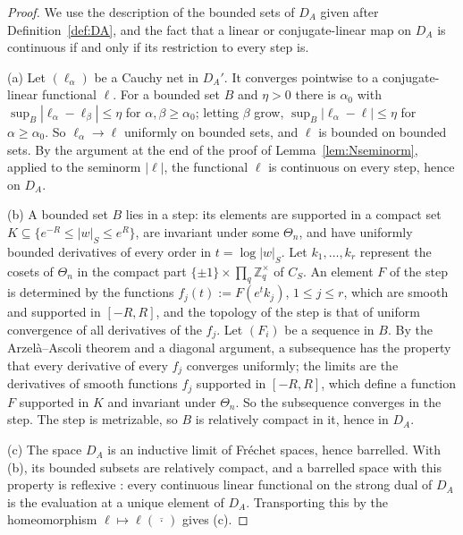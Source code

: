 \documentclass[11pt]{amsart}
\theoremstyle{definition}
\theoremstyle{remark}
\newcommand{\Z}{\mathbb Z}
\newcommand{\DA}{D_A}
\begin{document}
\begin{proof}
We use the description of the bounded sets of $\DA$ given after
Definition~\ref{def:DA}, and the fact that a linear or conjugate-linear map on
$\DA$ is continuous if and only if its restriction to every step is.

(a)  Let $(\ell_{\alpha})$ be a Cauchy net in $\DA'$.  It converges pointwise
to a conjugate-linear functional $\ell$.  For a bounded set $B$ and
$\eta>0$ there is $\alpha_0$ with
$\sup_B|\ell_{\alpha}-\ell_{\beta}|\le\eta$ for
$\alpha,\beta\ge\alpha_0$; letting $\beta$ grow,
$\sup_B|\ell_{\alpha}-\ell|\le\eta$ for $\alpha\ge\alpha_0$.  So
$\ell_{\alpha}\to\ell$ uniformly on bounded sets, and $\ell$ is bounded on
bounded sets.  By the argument at the end of the proof of
Lemma~\ref{lem:Nseminorm}, applied to the seminorm $|\ell|$, the functional
$\ell$ is continuous on every step, hence on $\DA$.

(b)  A bounded set $B$ lies in a step: its elements are supported in a compact
set $K\subseteq\{e^{-R}\le|w|_S\le e^{R}\}$, are invariant under some
$\Theta_n$, and have uniformly bounded derivatives of every order in
$t=\log|w|_S$.  Let $k_1,\dots,k_r$ represent the cosets of $\Theta_n$ in the
compact part $\{\pm1\}\times\prod_q\Z_q^{\times}$ of $C_S$.  An element $F$ of
the step is determined by the functions $f_j(t):=F(e^{t}k_j)$,
$1\le j\le r$, which are smooth and supported in $[-R,R]$, and the topology of
the step is that of uniform convergence of all derivatives of the $f_j$.  Let
$(F_i)$ be a sequence in $B$.  By the Arzel\`a--Ascoli theorem and a diagonal
argument, a subsequence has the property that every derivative of every $f_j$
converges uniformly; the limits are the derivatives of smooth functions $f_j$
supported in $[-R,R]$, which define a function $F$ supported in $K$ and
invariant under $\Theta_n$.  So the subsequence converges in the step.  The
step is metrizable, so $B$ is relatively compact in it, hence in $\DA$.

(c)  The space $\DA$ is an inductive limit of Fr\'echet spaces, hence
barrelled.  With (b), its bounded subsets are relatively compact, and a
barrelled space with this property is reflexive
\cite[Ch.~IV, \S5]{Schaefer}: every continuous linear functional on the
strong dual of $\DA$ is the evaluation at a unique element of $\DA$.
Transporting this by the homeomorphism $\ell\mapsto\ell(\overline{\,\cdot\,})$
gives (c).
\end{proof}
\end{document}
